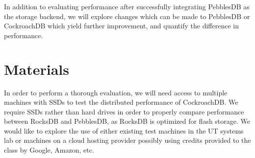 \documentclass[10pt,twocolumn,letterpaper]{article}
\begin{document}
In addition to evaluating performance after successfully integrating PebblesDB
as the storage backend, we will explore changes which can be made to PebblesDB
or CockroachDB which yield further improvement, and quantify the difference in
performance.

\section{Materials}
In order to perform a thorough evaluation, we will need access to multiple
machines with SSDs to test the distributed performance of CockroachDB. We
require SSDs rather than hard drives in order to properly compare performance
between RocksDB and PebblesDB, as RocksDB is optimized for flash storage. We
would like to explore the use of either existing test machines in the UT
systems lab or machines on a cloud hosting provider possibly using credits
provided to the class by Google, Amazon, etc.

\end{document}
